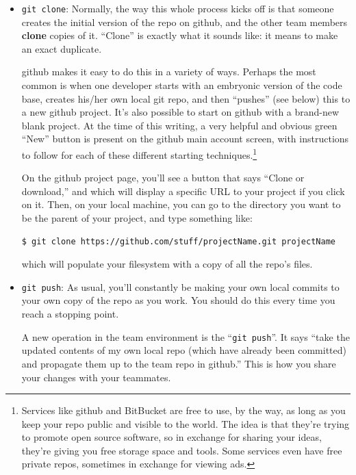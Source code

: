 \begin{itemize}
\item \texttt{git clone}: Normally, the way this whole process kicks off is
that someone creates the initial version of the repo on github, and the other
team members \textbf{clone} copies of it. ``Clone'' is exactly what it sounds
like: it means to make an exact duplicate.

github makes it easy to do this in a variety of ways. Perhaps the most common
is when one developer starts with an embryonic version of the code base,
creates his/her own local git repo, and then ``pushes'' (see below) this to a
new github project. It's also possible to start on github with a brand-new
blank project. At the time of this writing, a very helpful and obvious green
``New'' button is present on the github main account screen, with instructions
to follow for each of these different starting techniques.\footnote{Services
like github and BitBucket are free to use, by the way, as long as you keep
your repo public and visible to the world. The idea is that they're trying to
promote open source software, so in exchange for sharing your ideas, they're
giving you free storage space and tools. Some services even have free private
repos, sometimes in exchange for viewing ads.}

On the github project page, you'll see a button that says ``Clone or
download,'' and which will display a specific URL to your project if you click
on it. Then, on your local machine, you can go to the directory you want to be
the parent of your project, and type something like:

\begin{Verbatim}[fontsize=\small,samepage=true,frame=none]
$ git clone https://github.com/stuff/projectName.git projectName
\end{Verbatim}

which will populate your filesystem with a copy of all the repo's files.

\pagebreak
{}
\item \texttt{git push}: As usual, you'll constantly be making your own local
commits to your own copy of the repo as you work. You should do this every
time you reach a stopping point.

A new operation in the team environment is the ``\texttt{git push}''. It says
``take the updated contents of my own local repo (which have already been
committed) and propagate them up to the team repo in github.'' This is how you
share your changes with your teammates.


\end{itemize}

